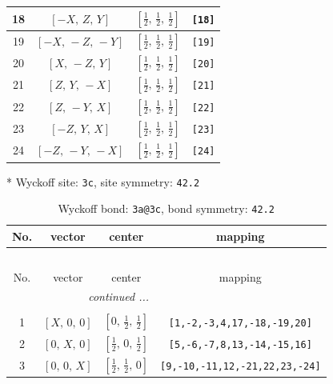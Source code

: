 \documentclass[fleqn,8pt]{jsarticle}
\begin{document}
\begin{longtable}{cccc}
18 & $\left[ - X,\, Z,\, Y \right]$ & $\left[ \frac{1}{2},\, \frac{1}{2},\, \frac{1}{2} \right]$ & {\tt [18]} \\ \hline
19 & $\left[ - X,\, - Z,\, - Y \right]$ & $\left[ \frac{1}{2},\, \frac{1}{2},\, \frac{1}{2} \right]$ & {\tt [19]} \\ \hline
20 & $\left[ X,\, - Z,\, Y \right]$ & $\left[ \frac{1}{2},\, \frac{1}{2},\, \frac{1}{2} \right]$ & {\tt [20]} \\ \hline
21 & $\left[ Z,\, Y,\, - X \right]$ & $\left[ \frac{1}{2},\, \frac{1}{2},\, \frac{1}{2} \right]$ & {\tt [21]} \\ \hline
22 & $\left[ Z,\, - Y,\, X \right]$ & $\left[ \frac{1}{2},\, \frac{1}{2},\, \frac{1}{2} \right]$ & {\tt [22]} \\ \hline
23 & $\left[ - Z,\, Y,\, X \right]$ & $\left[ \frac{1}{2},\, \frac{1}{2},\, \frac{1}{2} \right]$ & {\tt [23]} \\ \hline
24 & $\left[ - Z,\, - Y,\, - X \right]$ & $\left[ \frac{1}{2},\, \frac{1}{2},\, \frac{1}{2} \right]$ & {\tt [24]} \\
\end{longtable}
* Wyckoff site: {\tt 3c}, site symmetry: {\tt 42.2}
\renewcommand{\arraystretch}{1.2}
\begin{longtable}{cccc}
\caption{Wyckoff bond: {\tt 3a@3c}, bond symmetry: {\tt 42.2}}
 \\
 \hline \hline
No. & vector & center & mapping \\ \hline \endfirsthead

\multicolumn{3}{l}{\tablename\ \thetable{}} \\
 \hline \hline
No. & vector & center & mapping \\ \hline \endhead

 \hline \hline
\multicolumn{3}{r}{\footnotesize\it continued ...} \\ \endfoot

 \hline \hline
\multicolumn{3}{r}{} \\ \endlastfoot

1 & $\left[ X,\, 0,\, 0 \right]$ & $\left[ 0,\, \frac{1}{2},\, \frac{1}{2} \right]$ & {\tt [1,-2,-3,4,17,-18,-19,20]} \\ \hline
2 & $\left[ 0,\, X,\, 0 \right]$ & $\left[ \frac{1}{2},\, 0,\, \frac{1}{2} \right]$ & {\tt [5,-6,-7,8,13,-14,-15,16]} \\ \hline
3 & $\left[ 0,\, 0,\, X \right]$ & $\left[ \frac{1}{2},\, \frac{1}{2},\, 0 \right]$ & {\tt [9,-10,-11,12,-21,22,23,-24]} \\
\end{longtable}
\end{document}
